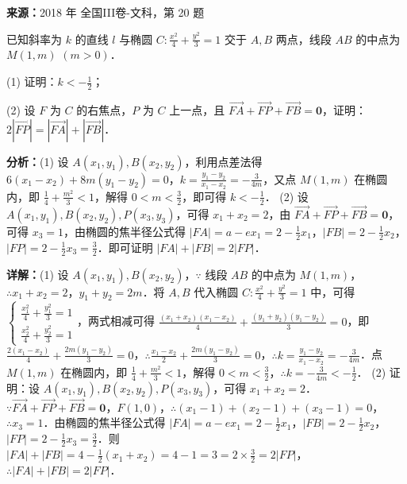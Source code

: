 \begin{question}[points=12]
\textbf{来源：}2018 年 全国III卷-文科，第 20 题\par
已知斜率为 $k$ 的直线 $l$ 与椭圆 $C: \frac{x^2}{4}+\frac{y^2}{3}=1$ 交于 $A,B$ 两点，线段 $AB$ 的中点为 $M(1,m)$ $(m>0)$．

(1) 证明：$k<-\frac{1}{2}$；

(2) 设 $F$ 为 $C$ 的右焦点，$P$ 为 $C$ 上一点，且 $\overrightarrow{FA}+\overrightarrow{FP}+\overrightarrow{FB}=\boldsymbol{0}$，证明：$2|\overrightarrow{FP}|=|\overrightarrow{FA}|+|\overrightarrow{FB}|$．
\begin{solution}

\textbf{分析：}(1) 设 $A(x_1,y_1),B(x_2,y_2)$，利用点差法得 $6(x_1-x_2)+8m(y_1-y_2)=0$，$k=\frac{y_1-y_2}{x_1-x_2}=-\frac{3}{4m}$，又点 $M(1,m)$ 在椭圆内，即 $\frac{1}{4}+\frac{m^2}{3}<1$，解得 $0<m<\frac{3}{2}$，即可得 $k<-\frac{1}{2}$．
(2) 设 $A(x_1,y_1),B(x_2,y_2),P(x_3,y_3)$，可得 $x_1+x_2=2$，由 $\overrightarrow{FA}+\overrightarrow{FP}+\overrightarrow{FB}=\boldsymbol{0}$，可得 $x_3=1$，由椭圆的焦半径公式得 $|FA|=a-ex_1=2-\frac{1}{2}x_1$，$|FB|=2-\frac{1}{2}x_2$，$|FP|=2-\frac{1}{2}x_3=\frac{3}{2}$．即可证明 $|FA|+|FB|=2|FP|$．

\textbf{详解：}(1) 设 $A(x_1,y_1),B(x_2,y_2)$，$\because$ 线段 $AB$ 的中点为 $M(1,m)$，$\therefore x_1+x_2=2$，$y_1+y_2=2m$．将 $A,B$ 代入椭圆 $C: \frac{x^2}{4}+\frac{y^2}{3}=1$ 中，可得 $\begin{cases} \frac{x_1^2}{4}+\frac{y_1^2}{3}=1 \\ \frac{x_2^2}{4}+\frac{y_2^2}{3}=1 \end{cases}$，两式相减可得 $\frac{(x_1+x_2)(x_1-x_2)}{4}+\frac{(y_1+y_2)(y_1-y_2)}{3}=0$，即 $\frac{2(x_1-x_2)}{4}+\frac{2m(y_1-y_2)}{3}=0$，$\therefore \frac{x_1-x_2}{2}+\frac{2m(y_1-y_2)}{3}=0$，$\therefore k=\frac{y_1-y_2}{x_1-x_2}=-\frac{3}{4m}$．点 $M(1,m)$ 在椭圆内，即 $\frac{1}{4}+\frac{m^2}{3}<1$，解得 $0<m<\frac{3}{2}$，$\therefore k=-\frac{3}{4m}<-\frac{1}{2}$．
(2) 证明：设 $A(x_1,y_1),B(x_2,y_2),P(x_3,y_3)$，可得 $x_1+x_2=2$．$\because \overrightarrow{FA}+\overrightarrow{FP}+\overrightarrow{FB}=\boldsymbol{0}$，$F(1,0)$，$\therefore (x_1-1)+(x_2-1)+(x_3-1)=0$，$\therefore x_3=1$．由椭圆的焦半径公式得 $|FA|=a-ex_1=2-\frac{1}{2}x_1$，$|FB|=2-\frac{1}{2}x_2$，$|FP|=2-\frac{1}{2}x_3=\frac{3}{2}$．则 $|FA|+|FB|=4-\frac{1}{2}(x_1+x_2)=4-1=3=2\times\frac{3}{2}=2|FP|$，$\therefore |FA|+|FB|=2|FP|$．
\end{solution}
\end{question}

